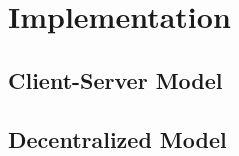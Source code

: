 
\chapter{Implementation}
\label{chp:implementation}

\section{Client-Server Model}

\section{Decentralized Model}
